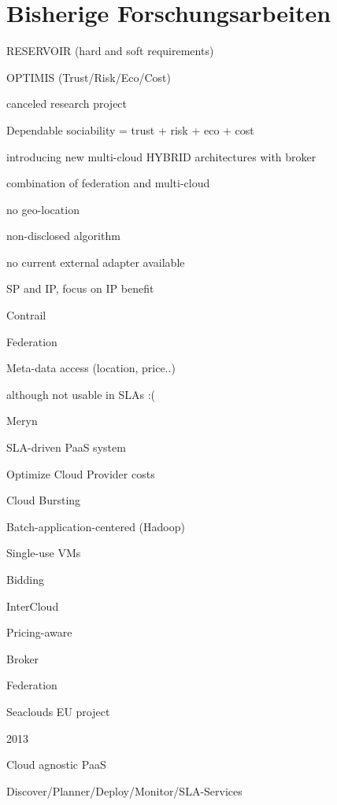 
\section{Bisherige Forschungsarbeiten}



RESERVOIR (hard and soft requirements) 



OPTIMIS (Trust/Risk/Eco/Cost) 

canceled research project 

Dependable sociability = trust + risk + eco + cost 

introducing new multi-cloud HYBRID architectures with broker 

combination of federation and multi-cloud 

no geo-location 

non-disclosed algorithm 

no current external adapter available 

SP and IP, focus on IP benefit 





Contrail 

Federation 

Meta-data access (location, price..) 

although not usable in SLAs  :( 



Meryn 

SLA-driven PaaS system 

Optimize Cloud Provider costs 

Cloud Bursting 

Batch-application-centered (Hadoop) 

Single-use VMs 

Bidding 



InterCloud 

Pricing-aware 

Broker 

Federation 



Seaclouds EU project 

2013 

Cloud agnostic PaaS 

Discover/Planner/Deploy/Monitor/SLA-Services 

